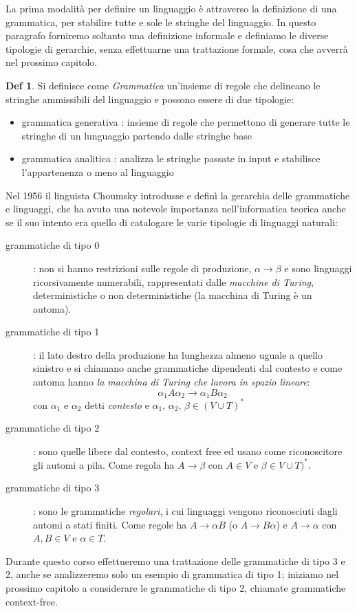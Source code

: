 \documentclass[a4paper]{book}
\theoremstyle{definition}%
\newtheorem*{defi}{Def}%
\begin{document}
La prima modalità per definire un linguaggio è attraverso la definizione di una grammatica, per stabilire tutte e sole
le stringhe del linguaggio.
In questo paragrafo forniremo soltanto una definizione informale e definiamo le diverse tipologie di gerarchie, senza
effettuarne una trattazione formale, cosa che avverrà nel prossimo capitolo.
\begin{defi}
    Si definisce come \emph{Grammatica} un'insieme di regole che delineano le stringhe ammissibili del linguaggio e
    possono essere di due tipologie:
    \begin{itemize}
      \item grammatica generativa : insieme di regole che permettono di generare tutte le stringhe di un lunguaggio partendo dalle stringhe base 
      \item grammatica analitica : analizza le stringhe passate in input e stabilisce l'appartenenza o meno al linguaggio
    \end{itemize}
\end{defi}
  Nel 1956 il linguista Choumsky introdusse e definì la gerarchia delle grammatiche e linguaggi, che ha avuto una notevole importanza
  nell'informatica teorica anche se il suo intento era quello di catalogare le varie tipologie di linguaggi naturali:
\begin{description}
  \item [grammatiche di tipo 0]: non si hanno restrizioni sulle regole di produzione, $\alpha\to\beta$ e sono linguaggi ricorsivamente numerabili,
    rappresentati dalle \emph{macchine di Turing}, deterministiche o non deterministiche (la macchina di Turing è un automa).
    
  \item [grammatiche di tipo 1]:  il lato destro della produzione ha lunghezza almeno uguale a quello sinistro e si chiamano anche
        grammatiche dipendenti dal contesto e come automa hanno \emph{la macchina di Turing che lavora in spazio lineare}:
        \[ \alpha_1A\alpha_2\to \alpha_1B\alpha_2 \]
        con $\alpha_1$ e $\alpha_2$ detti \emph{contesto} e $\alpha_1,\,\alpha_2,\, \beta\in (V\cup T)^*$

  \item [grammatiche di tipo 2]: sono quelle libere dal contesto, context free ed usano come riconoscitore gli automi a pila.
        Come regola ha $A\to\beta$ con $A\in V$ e $\beta\in V\cup T)^*$.
        
  \item [grammatiche di tipo 3]: sono le grammatiche \emph{regolari}, i cui linguaggi vengono riconosciuti dagli automi a stati finiti.\newline
        Come regole ha $A\to\alpha B$ (o $A\to B\alpha$) e $A\to\alpha$  con $A,B\in V$ e $\alpha\in T$. 
\end{description}
Durante questo corso effettueremo una trattazione delle grammatiche di tipo 3 e 2, anche se analizzeremo solo un esempio di grammatica di tipo 1;
iniziamo nel prossimo capitolo a considerare le grammatiche di tipo 2, chiamate grammatiche context-free.
\end{document}
